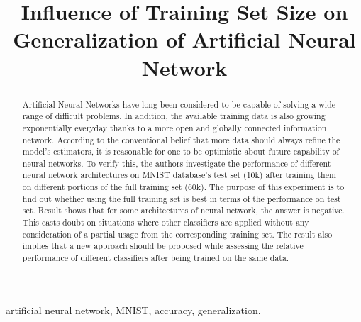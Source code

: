 \documentclass[conference]{IEEEtran}
\begin{document}
\title{Influence of Training Set Size on Generalization of Artificial Neural Network}
\author{
\and

\and
{}
}
\maketitle
\begin{abstract}
Artificial Neural Networks have long been considered to be capable of solving a wide range of difficult problems. In addition, the available training data is also growing exponentially everyday thanks to a more open and globally connected information network. According to the conventional belief that more data should always refine the model's estimators, it is reasonable for one to be optimistic about future capability of neural networks. To verify this, the authors investigate the performance of different neural network architectures on MNIST database's test set (10k) after training them on different portions of the full training set (60k). The purpose of this experiment is to find out whether using the full training set is best in terms of the performance on test set. Result shows that for some architectures of neural network, the answer is negative. This casts doubt on situations where other classifiers are applied without any consideration of a partial usage from the corresponding training set. The result also implies that a new approach should be proposed while assessing the relative performance of different classifiers after being trained on the same data.
\end{abstract}

\begin{IEEEkeywords}
artificial neural network, MNIST, accuracy, generalization.	 

\end{IEEEkeywords}
\end{document}
